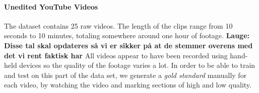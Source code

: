\paragraph{Unedited YouTube Videos}
%
The dataset contains 25 raw videos. The length of the clips range from 10 seconds to 10 minutes, totaling somewhere around one hour of footage. \textbf{Lauge: Disse tal skal opdateres så vi er sikker på at de stemmer overens med det vi rent faktisk har}
All videos appear to have been recorded using hand-held devices so the quality of the footage varies a lot. In order to be able to train and test on this part of the data set, we generate a \textit{gold standard} manually for each video, by watching the video and marking sections of high and low quality. %
%
